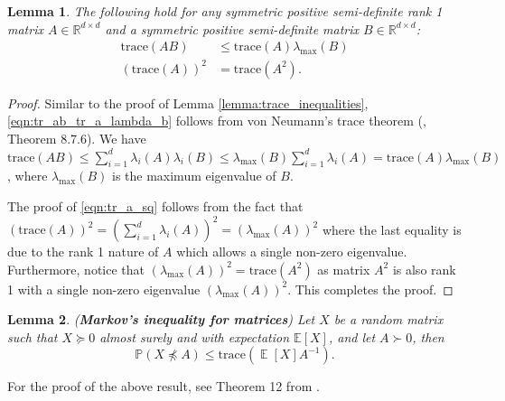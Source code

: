 \documentclass[letterpaper, 11 pt]{article}
\newcommand{\tr}[1]{\text{trace}\left( #1 \right)}
\DeclareMathOperator{\E}{\mathbb{E}}
\newtheorem{lemma}{Lemma}
\begin{document}
\begin{lemma}
    \label{lemma:trace_inequalities_rank_1}
    The following hold for any symmetric positive semi-definite rank 1 matrix $A \in \mathbb{R}^{d \times d}$ and a symmetric positive semi-definite matrix $B \in \mathbb{R}^{d \times d}$:
    \begin{align}
        \tr{AB} &\leq \tr{A}\lambda_{\max}(B) \label{eqn:tr_ab_tr_a_lambda_b}\\
        (\tr{A})^2 &= \tr{A^2} \label{eqn:tr_a_sq}.
    \end{align}
\end{lemma}
\begin{proof}
    Similar to the proof of Lemma \ref{lemma:trace_inequalities}, \eqref{eqn:tr_ab_tr_a_lambda_b} follows from von Neumann's trace theorem (\cite{horn2012matrix}, Theorem 8.7.6). We have $\tr{AB} \leq \sum_{i = 1}^d \lambda_i(A) \lambda_i(B) \leq \lambda_{\max}(B)\sum_{i = 1}^d \lambda_i(A) = \tr{A}\lambda_{\max}(B)$, where $\lambda_{\max}(B)$ is the maximum eigenvalue of $B$. 

    The proof of \eqref{eqn:tr_a_sq} follows from the fact that $(\tr{A})^2 = \left(\sum_{i = 1}^d \lambda_i(A)\right)^2 = \left(\lambda_{\max}(A)\right)^2$ where the last equality is due to the  rank 1 nature of $A$ which allows a single non-zero eigenvalue. Furthermore, notice that $\left(\lambda_{\max}(A)\right)^2 = \tr{A^2}$ as matrix $A^2$ is also rank 1 with a single non-zero eigenvalue $\left(\lambda_{\max}(A)\right)^2$. This completes the proof. 
\end{proof}

\begin{lemma} (\textbf{Markov's inequality for matrices})
    \label{lemma:matrix_markov}
    Let $X$ be a random matrix such that $X \succeq 0$ almost surely and with expectation $\mathbb{E}[X]$, and let $A \succ 0$, then
    \begin{equation}
    \label{eqn:matrix_markov}
        \mathbb{P}\left( X \not\preceq A \right) \leq \tr{\E[X]A^{-1}}. 
    \end{equation}
\end{lemma}
For the proof of the above result, see Theorem 12 from \cite{ahlswede2001strong}.
\end{document}
